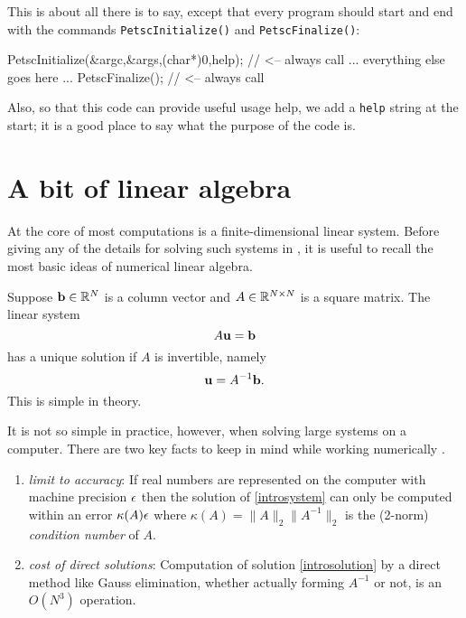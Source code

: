 This is about all there is to say, except that every \PETSc program should start and end with the commands \texttt{PetscInitialize()} and \texttt{PetscFinalize()}:
\begin{code}
  PetscInitialize(&argc,&args,(char*)0,help);  // <-- always call
  ... everything else goes here ...
  PetscFinalize();  // <-- always call
\end{code}
Also, so that this \PETSc code can provide useful usage help, we add a \texttt{help} string at the start; it is a good place to say what the purpose of the code is.


\section{A bit of linear algebra}

At the core of most \PETSc computations is a finite-dimensional linear system.  Before giving any of the details for solving such systems in \PETSc, it is useful to recall the most basic ideas of numerical linear algebra.

Suppose $\mathbf{b}\in \mathbb{R}^{N}$ is a column vector and $A\in\mathbb{R}^{N\times N}$ is a square matrix.  The linear system
\begin{equation}
A \mathbf{u} = \mathbf{b} \label{introsystem}
\end{equation}
has a unique solution if $A$ is invertible, namely
\begin{equation}
\mathbf{u} = A^{-1} \mathbf{b}. \label{introsolution}
\end{equation}
This is simple in theory.

It is not so simple in practice, however, when solving large systems on a computer.  There are two key facts to keep in mind while working numerically  \citep{TrefethenBau}.
\renewcommand{\labelenumi}{\roman{enumi})}
\begin{enumerate}
\item \emph{limit to accuracy}:  If real numbers are represented on the computer with machine precision $\epsilon$ then the solution of \eqref{introsystem} can only be computed within an error $\kappa(A) \epsilon$ where $\kappa(A) = \|A\|_2 \|A^{-1}\|_2$ is the (2-norm) \emph{condition number} of $A$.
\item \emph{cost of direct solutions}:  Computation of solution \eqref{introsolution} by a direct method like Gauss elimination, whether actually forming $A^{-1}$ or not, is an $O(N^3)$ operation.
\end{enumerate}


